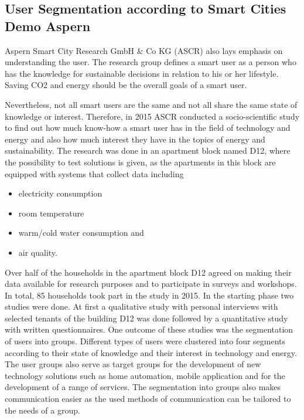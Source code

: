 \subsection{User Segmentation according to Smart Cities Demo Aspern}
\label{chap:usersegmentation}

Aspern Smart City Research GmbH \& Co KG (ASCR) also lays emphasis on understanding the user. The research group defines a smart user as a person who has the knowledge for sustainable decisions in relation to his or her lifestyle. Saving CO2 and energy should be the overall goals of a smart user.

Nevertheless, not all smart users are the same and not all share the same state of knowledge or interest. Therefore, in 2015 ASCR conducted a socio-scientific study to find out how much know-how a smart user has in the field of technology and energy and also how much interest they have in the topics of energy and sustainability. The research was done in an apartment block named D12, where the possibility to test solutions is given, as the apartments in this block are equipped with systems that collect data including

\begin{itemize}
	\item electricity consumption
	\item room temperature
	\item warm/cold water consumption and
	\item air quality.
\end{itemize}

Over half of the households in the apartment block D12 agreed on making their data available for research purposes and to participate in surveys and workshops. In total, 85 households took part in the study in 2015. In the starting phase two studies were done. At first a qualitative study with personal interviews with selected tenants of the building D12 was done followed by a quantitative study with written questionnaires. One outcome of these studies was the segmentation of users into groups. Different types of users were clustered into four segments according to their state of knowledge and their interest in technology and energy. The user groups also serve as target groups for the development of new technology solutions such as home automation, mobile application and for the development of a range of services. The segmentation into groups also makes communication easier as the used methods of communication can be tailored to the needs of a group.

